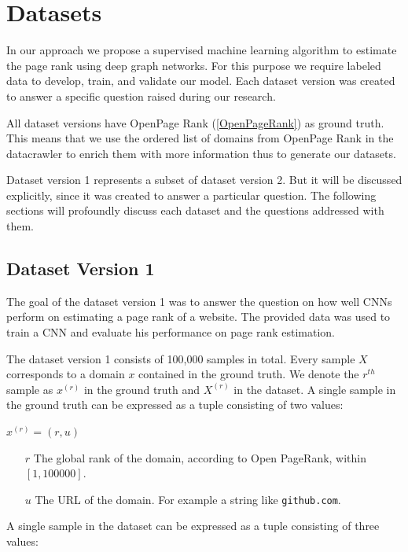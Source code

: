
\section{Datasets}

In our approach we propose a supervised machine learning algorithm to estimate the page rank using deep graph networks. For this purpose we require labeled data to develop, train, and validate our model. Each dataset version was created to answer a specific question raised during our research.

All dataset versions have OpenPage Rank (\ref{OpenPageRank}) as ground truth. This means that we use the ordered list of domains from OpenPage Rank in the datacrawler to enrich them with more information thus to generate our datasets.

Dataset version 1 represents a subset of dataset version 2. But it will be discussed explicitly, since it was created to answer a particular question. The following sections will profoundly discuss each dataset and the questions addressed with them. 

\subsection{Dataset Version 1}
\label{DatasetVersion1}
The goal of the dataset version 1 was to answer the question on how well CNNs perform on estimating a page rank of a website. The provided data was used to train a CNN and evaluate his performance on page rank estimation.

The dataset version 1 consists of 100,000 samples in total. Every sample $X$ corresponds to a domain $x$ contained in the ground truth. We denote the $r^{th}$ sample as $x^{(r)}$ in the ground truth and $X^{(r)}$ in the dataset. 
A single sample in the ground truth can be expressed as a tuple consisting of two values:

\begin{center}
	$x^{(r)} = (r, u)$
	\begin{itemize}
		\item[$r$] The global rank of the domain, according to Open PageRank, within $[1, 100000]$. 
		\item[$u$] The URL of the domain. For example a string like \texttt{github.com}.
	\end{itemize}
\end{center}

A single sample in the dataset can be expressed as a tuple consisting of three values:

